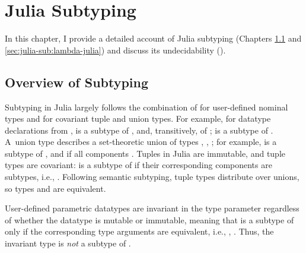 \chapter{Julia Subtyping}%
\label{chap:julia-sub}

In this chapter, I provide a detailed account of Julia subtyping
(Chapters \ref{sec:julia-sub:overview} and \ref{sec:julia-sub:lambda-julia})
and discuss its undecidability ().

\section{Overview of Subtyping}\label{sec:julia-sub:overview}

Subtyping in Julia largely follows the combination of
 for user-defined nominal types and
 for covariant tuple and union types.
For example, for datatype declarations from , 
 is a subtype of , and, transitively, of ;
 is a subtype of .
A~union type  describes a set-theoretic union of
types , , ; for example,  is a subtype of
, and  if all
components .
Tuples in Julia are immutable, and tuple types are covariant:
 is a subtype of  if
their corresponding components are subtypes, i.e., .
Following semantic subtyping, tuple types distribute over unions,
so types  and
 are equivalent.

User-defined parametric datatypes are invariant in the type parameter
regardless of whether the datatype is
mutable or immutable, meaning that  is a subtype of 
 only if the corresponding type arguments are equivalent,
i.e., , .
Thus, the invariant %
type  is \emph{not}
a subtype of .

